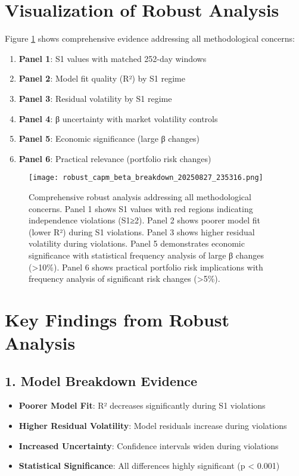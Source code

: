 \documentclass[11pt,a4paper]{article}
\begin{document}
\section{Visualization of Robust Analysis}

Figure \ref{fig:robust_analysis} shows comprehensive evidence addressing all methodological concerns:

\begin{enumerate}
\item \textbf{Panel 1}: S1 values with matched 252-day windows
\item \textbf{Panel 2}: Model fit quality (R²) by S1 regime
\item \textbf{Panel 3}: Residual volatility by S1 regime
\item \textbf{Panel 4}: β uncertainty with market volatility controls
\item \textbf{Panel 5}: Economic significance (large β changes)
\item \textbf{Panel 6}: Practical relevance (portfolio risk changes)
\end{enumerate}

\begin{figure}[H]
\centering
\texttt{[image: robust\_capm\_beta\_breakdown\_20250827\_235316.png]}
\caption{Comprehensive robust analysis addressing all methodological concerns. Panel 1 shows S1 values with red regions indicating independence violations (S1≥2). Panel 2 shows poorer model fit (lower R²) during S1 violations. Panel 3 shows higher residual volatility during violations. Panel 5 demonstrates economic significance with statistical frequency analysis of large β changes (>10\%). Panel 6 shows practical portfolio risk implications with frequency analysis of significant risk changes (>5\%).}
\label{fig:robust_analysis}
\end{figure}

\section{Key Findings from Robust Analysis}

\subsection{1. Model Breakdown Evidence}

\begin{itemize}
\item \textbf{Poorer Model Fit}: R² decreases significantly during S1 violations
\item \textbf{Higher Residual Volatility}: Model residuals increase during violations
\item \textbf{Increased Uncertainty}: Confidence intervals widen during violations
\item \textbf{Statistical Significance}: All differences highly significant (p < 0.001)
\end{itemize}
\end{document}
